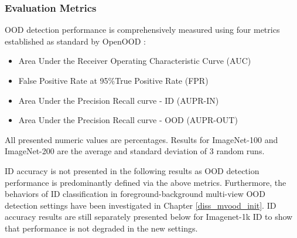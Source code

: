 \subsubsection{Evaluation Metrics}
OOD detection performance is comprehensively measured using four metrics established as standard by OpenOOD \cite{yang2022openood,zhang2023openood}:
\begin{itemize}
    \item Area Under the Receiver Operating Characteristic Curve (AUC)
    \item False Positive Rate at 95\%True Positive Rate (FPR)
    \item Area Under the Precision Recall curve - ID (AUPR-IN)
    \item Area Under the Precision Recall curve - OOD (AUPR-OUT)
\end{itemize}
All presented numeric values are percentages. Results for ImageNet-100 and ImageNet-200 are the average and standard deviation of 3 random runs.

ID accuracy is not presented in the following results as OOD detection performance is predominantly defined via the above metrics. Furthermore, the behaviors of ID classification in foreground-background multi-view OOD detection settings have been investigated in Chapter \ref{diss_mvood_init}. ID accuracy results are still separately presented below for Imagenet-1k ID to show that performance is not degraded in the new settings.


